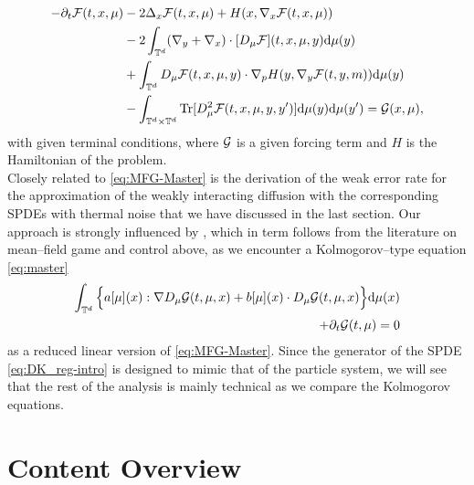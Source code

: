 \begin{align}\label{eq:MFG-Master}
    -\partial_t \mathcal{F}(t, x, \mu) & - 2\Delta_x \mathcal{F}(t, x, \mu) + H(x, \nabla_x \mathcal{F}(t, x, \mu)) \nonumber \\
     & - 2\int_{\mathbb{T}^d} (\nabla_y +  \nabla_x) \cdot [D_{\mu} \mathcal{F}](t, x, \mu, y) \mathrm{d}\mu(y) \nonumber\\
     & + \int_{\mathbb{T}^d} D_\mu \mathcal{F}(t, x, \mu, y) \cdot \nabla_p H(y, \nabla_y \mathcal{F}(t, y, m)) \mathrm{d}\mu(y)\nonumber \\
    &- \int_{\mathbb{T}^d \times \mathbb{T}^d} \mathrm{Tr}[D_{\mu}^2 \mathcal{F}(t, x, \mu, y, y')] \mathrm{d}\mu(y) \mathrm{d}\mu(y') = \mathcal{G}(x, \mu), 
\end{align}
with given terminal conditions, where $\mathcal{G}$ is a given forcing term and $H$ is the Hamiltonian of the problem. \\

Closely related to \eqref{eq:MFG-Master} is the derivation of the weak error rate for the approximation of the weakly interacting diffusion with the corresponding SPDEs with thermal noise that we have discussed in the last section. Our approach is strongly influenced by \cite{T21,CD22}, which in term follows from the literature on mean--field game and control above, as we encounter a Kolmogorov--type equation \eqref{eq:master} 
\begin{align*}
\int_{\mathbb{T}^d} \Big\{a[\mu](x):\nabla D_{\mu}\mathcal{G}(t,\mu,x) + b[\mu](x)\cdot D_{\mu}\mathcal{G}(t,\mu,x)\Big\}\mathrm{d}\mu(x)\\
+ \partial_t \mathcal{G}(t,\mu) = 0
\end{align*}
as a reduced linear version of \eqref{eq:MFG-Master}. Since the generator of the SPDE \eqref{eq:DK_reg-intro} is designed to mimic that of the particle system, we will see that the rest of the analysis is mainly technical as we compare the Kolmogorov equations.
\newpage

\section*{Content Overview}

